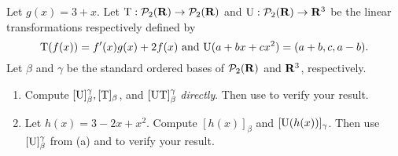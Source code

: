 \begin{exercise} \label{exercise 2.3.3}
Let \(g(x) = 3 + x\).
Let \(\mathrm{T}: \mathcal{P}_{2}(\mathbf{R}) \to \mathcal{P}_{2}(\mathbf{R})\)  and \(\mathrm{U}: \mathcal{P}_{2}(\mathbf{R}) \to \mathbf{R}^3\) be the linear transformations respectively defined by
\[
    \mathrm{T}(f(x)) = f'(x) g(x) + 2 f(x) \text{ and } \mathrm{U}(a + bx + cx^2) = (a + b, c, a - b). 
\]
Let  \(\beta\) and \(\gamma\) be the standard ordered bases of  \(\mathcal{P}_{2}(\mathbf{R})\) and \(\mathbf{R}^3\), respectively.
\begin{enumerate}
\item Compute \([\mathrm{U}]_{\beta}^{\gamma}, [\mathrm{T}]_{\beta}\), and \([\mathrm{U}\mathrm{T}]_{\beta}^{\gamma}\) \emph{directly}.
    Then use  to verify your result.
\item Let \(h(x) = 3 - 2x + x^2\).
    Compute \([h(x)]_{\beta}\) and \([\mathrm{U}(h(x))]_{\gamma}\).
    Then use \([\mathrm{U}]_{\beta}^{\gamma}\) from (a) and  to verify your result.
\end{enumerate}
\end{exercise}

